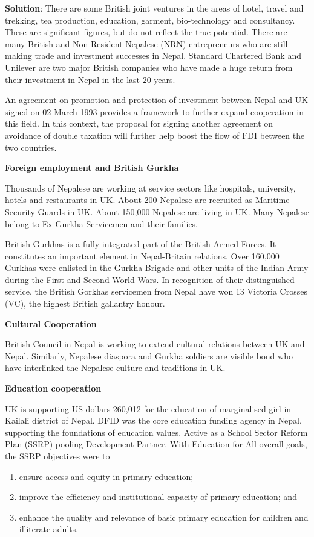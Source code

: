 \documentclass[
  openany]{book}
\newenvironment{solution}{ {\bfseries Solution}:}{}
\begin{document}
\begin{questions}
\begin{solution}
There are some British joint ventures in the areas of hotel, travel and trekking, tea production, education, garment, bio-technology and consultancy. These are significant figures, but do not reflect the true potential. There are many British and Non Resident Nepalese (NRN) entrepreneurs who are still making trade and investment successes in Nepal. Standard Chartered Bank and Unilever are two major British companies who have made a huge return from their investment in Nepal in the last 20 years.

An agreement on promotion and protection of investment between Nepal and UK signed on 02 March 1993 provides a framework to further expand cooperation in this field. In this context, the proposal for signing another agreement on avoidance of double taxation will further help boost the flow of FDI between the two countries.

\textbf{Foreign employment and British Gurkha}

Thousands of Nepalese are working at service sectors like hospitals, university, hotels and restaurants in UK. About 200 Nepalese are recruited as Maritime Security Guards in UK. About 150,000 Nepalese are living in UK. Many Nepalese belong to Ex-Gurkha Servicemen and their families.

British Gurkhas is a fully integrated part of the British Armed Forces. It constitutes an important element in Nepal-Britain relations.  Over 160,000 Gurkhas were enlisted in the Gurkha Brigade and other units of the Indian Army during the First and Second World Wars. In recognition of their distinguished service, the British Gorkhas servicemen from Nepal have won 13 Victoria Crosses (VC), the highest British gallantry honour.

\textbf{Cultural Cooperation}

British Council in Nepal is working to extend cultural relations between UK and Nepal. Similarly, Nepalese diaspora and Gurkha soldiers are visible bond who have interlinked the Nepalese culture and traditions in UK.

\textbf{Education cooperation}

UK is supporting US dollars 260,012 for the education of marginalised girl in Kailali district of Nepal. DFID was the core education funding agency in Nepal, supporting the foundations of education values. Active as a School Sector Reform Plan (SSRP) pooling Development Partner. With Education for All overall goals, the SSRP objectives were to 
\begin{enumerate}
\item ensure access and equity in primary education; 
\item improve the efficiency and institutional capacity of primary education; and 
\item enhance the quality and relevance of basic primary education for children and illiterate adults.
\end{enumerate}


\end{solution}
\end{questions}
\end{document}
